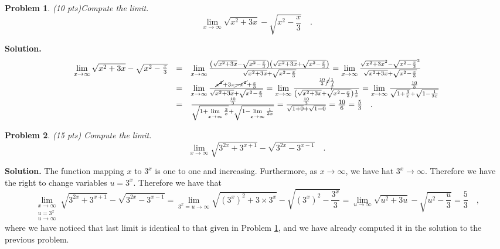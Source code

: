 \documentclass{article}
\newtheorem{problem}{Problem}
\begin{document}
\begin{problem} (10 pts)\label{probProblem8Test1}
Compute the limit.
\[\lim\limits_{x\to\infty}\sqrt{x^2+3x}-\sqrt{x^2-\frac{x}3}\quad .
\]
\end{problem}
\textbf{Solution. } 
\[
\begin{array}{rcl}
\lim\limits_{x\to\infty}\sqrt{x^2+3x}-\sqrt{x^2-\frac{x}3} &=& 
\lim\limits_{x\to\infty}\frac{\left(\sqrt{x^2+3x}-\sqrt{x^2-\frac{x}3}\right)\left(\sqrt{x^2+3x}+\sqrt{x^2-\frac{x}3}\right)}{\sqrt{x^2+3x}+\sqrt{x^2-\frac{x}3}}=\lim\limits_{x\to\infty} \frac{\sqrt{x^2+3x}^2-\sqrt{x^2-\frac{x}3}^2 }{\sqrt{x^2+3x}+\sqrt{x^2-\frac{x}3}}\\
&=& \lim\limits_{x\to\infty} \frac{ \cancel{x^2}+3x\cancel{-x^2}+\frac{x}{3} }{\sqrt{x^2+3x}+\sqrt{x^2-\frac{x}3}}=\lim\limits_{x\to \infty} \frac{\frac{10}3\cancel{x} \frac{1}{\cancel{x}}}{\left( \sqrt{x^2+3x}+\sqrt{x^2-\frac{x}3}\right) \frac{1}x } =
\lim\limits_{x\to \infty} \frac{\frac{10}3}{\sqrt{1+\frac{3}{x}}+\sqrt{1-\frac{1}{3x}}}\\
&=&\frac{\frac{10}3}{\sqrt{1+\lim\limits_{x\to \infty}\frac{3}x}+ \sqrt{1-\lim\limits_{x\to \infty}\frac{1}{3x}}}= \frac{\frac{10}{3}}{\sqrt{1+0}+\sqrt{1-0}}= \frac{10}6= \frac{5}3\quad .
\end{array}
\]

\begin{problem} (15 pts)
Compute the limit.
\[
\lim_{x\to \infty} \sqrt{ 3^{2x}+3^{x+1}}-\sqrt{3^{2x}-3^{x-1}}\quad .
\]
\end{problem}
\textbf{Solution. } The function mapping $x$ to $3^x$ is one to one and increasing.  Furthermore, as $x\to \infty$, we have hat $3^x\to \infty$. Therefore we have the right to change variables $u=3^x$. Therefore we have that 
\[
\lim\limits_{\substack{x\to \infty \\ u=3^x \\ u\to \infty}} \sqrt{ 3^{2x}+3^{x+1}}-\sqrt{3^{2x}-3^{x-1}} = \lim\limits_{ 3^x=u\to \infty}  \sqrt{ (3^{x})^2+3\times 3^{x}}-\sqrt{(3^{x})^2-\frac{3^{x}}{3}}= \lim \limits_{u\to \infty} \sqrt{ u^2+3u}-\sqrt{u^2-\frac{u}{3}}= \frac{5}{3}\quad, 
\]
where we have noticed that last limit is identical to that given in Problem \ref{probProblem8Test1}, and we have already computed it in the solution to the previous problem.
\end{document}
